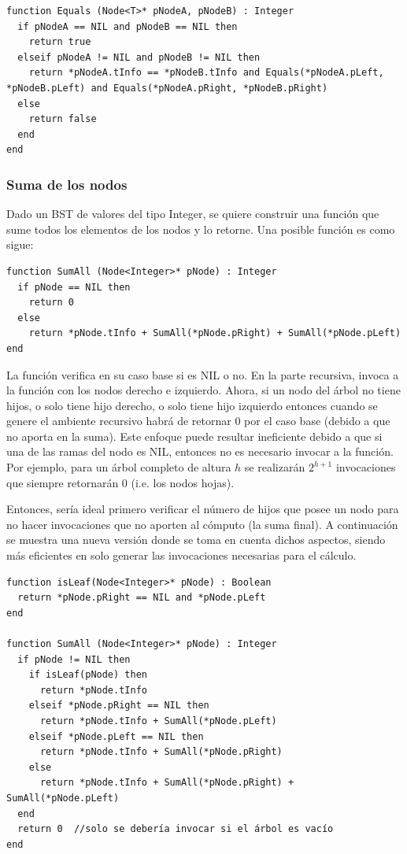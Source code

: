 \begin{lstlisting}[upquote=true, language=pseudo]
function Equals (Node<T>* pNodeA, pNodeB) : Integer
  if pNodeA == NIL and pNodeB == NIL then
    return true
  elseif pNodeA != NIL and pNodeB != NIL then
    return *pNodeA.tInfo == *pNodeB.tInfo and Equals(*pNodeA.pLeft, *pNodeB.pLeft) and Equals(*pNodeA.pRight, *pNodeB.pRight)
  else
    return false
  end
end
\end{lstlisting}


\subsubsection{Suma de los nodos}

Dado un BST de valores del tipo Integer, se quiere construir una función que sume todos los elementos de los nodos y lo retorne. Una posible función es como sigue:

\begin{lstlisting}[upquote=true, language=pseudo]
function SumAll (Node<Integer>* pNode) : Integer
  if pNode == NIL then
    return 0
  else
    return *pNode.tInfo + SumAll(*pNode.pRight) + SumAll(*pNode.pLeft)
end
\end{lstlisting}

La función verifica en su caso base si es NIL o no. En la parte recursiva, invoca a la función con los nodos derecho e izquierdo. Ahora, si un nodo del árbol no tiene hijos, o solo tiene hijo derecho, o solo tiene hijo izquierdo entonces cuando se genere el ambiente recursivo habrá de retornar 0 por el caso base (debido a que no aporta en la suma). Este enfoque puede resultar ineficiente debido a que si una de las ramas del nodo es NIL, entonces no es necesario invocar a la función. Por ejemplo, para un árbol completo de altura $h$ se realizarán $2^{h+1}$ invocaciones que siempre retornarán 0 (i.e. los nodos hojas).

Entonces, sería ideal primero verificar el número de hijos que posee un nodo para no hacer invocaciones que no aporten al cómputo (la suma final). A continuación se muestra una nueva versión donde se toma en cuenta dichos aspectos, siendo más eficientes en solo generar las invocaciones necesarias para el cálculo.

\begin{lstlisting}[upquote=true, language=pseudo]
function isLeaf(Node<Integer>* pNode) : Boolean
  return *pNode.pRight == NIL and *pNode.pLeft
end

function SumAll (Node<Integer>* pNode) : Integer
  if pNode != NIL then
    if isLeaf(pNode) then
      return *pNode.tInfo
    elseif *pNode.pRight == NIL then
      return *pNode.tInfo + SumAll(*pNode.pLeft)
    elseif *pNode.pLeft == NIL then
      return *pNode.tInfo + SumAll(*pNode.pRight)
    else
      return *pNode.tInfo + SumAll(*pNode.pRight) + SumAll(*pNode.pLeft)
  end
  return 0	//solo se debería invocar si el árbol es vacío
end
\end{lstlisting}


